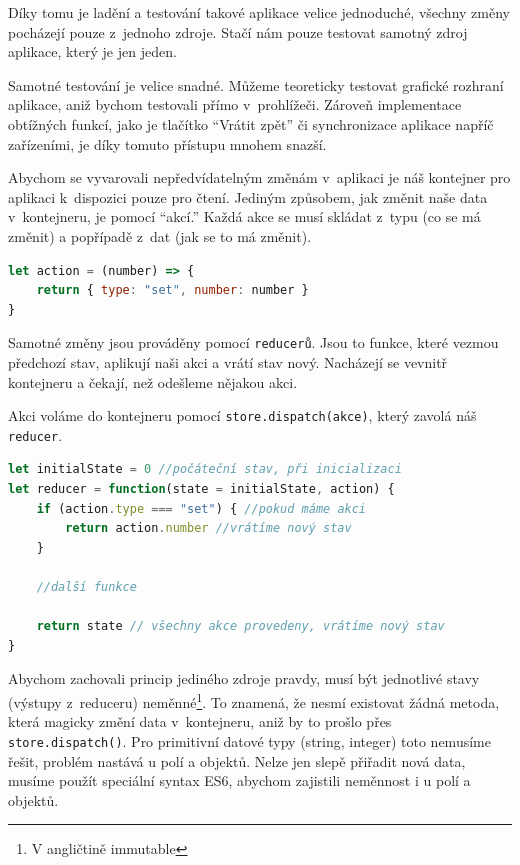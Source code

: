 \documentclass[a4paper,11pt,oneside]{article}
\begin{document}
Díky tomu je ladění a testování takové aplikace velice jednoduché, všechny změny pocházejí pouze z~jednoho zdroje. Stačí nám pouze testovat samotný zdroj aplikace, který je jen jeden. 

Samotné testování je velice snadné. Můžeme teoreticky testovat grafické rozhraní aplikace, aniž bychom testovali přímo v~prohlížeči. Zároveň implementace obtížných funkcí, jako je tlačítko \enquote{Vrátit zpět} či synchronizace aplikace napříč zařízeními, je díky tomuto přístupu mnohem snazší. 

Abychom se vyvarovali nepředvídatelným změnám v~aplikaci je náš kontejner pro aplikaci k~dispozici pouze pro čtení. Jediným způsobem, jak změnit naše data v~kontejneru, je pomocí \enquote{akcí.} Každá akce se musí skládat z~typu (co se má změnit) a popřípadě z~dat (jak se to má změnit). 

\begin{lstlisting}[language=javascript, caption={JavaScript}]
let action = (number) => {
	return { type: "set", number: number }
}
\end{lstlisting}

Samotné změny jsou prováděny pomocí \lstinline|reducerů|. Jsou to funkce, které vezmou předchozí stav, aplikují naši akci a vrátí stav nový. Nacházejí se vevnitř kontejneru a čekají, než odešleme nějakou akci.

Akci voláme do kontejneru pomocí \lstinline|store.dispatch(akce)|, který zavolá náš \lstinline|reducer|.

\begin{lstlisting}[language=javascript, caption={JavaScript}]
let initialState = 0 //počáteční stav, při inicializaci
let reducer = function(state = initialState, action) {
	if (action.type === "set") { //pokud máme akci 
		return action.number //vrátíme nový stav
	} 
	
	//další funkce
	
	return state // všechny akce provedeny, vrátíme nový stav
}
\end{lstlisting}

Abychom zachovali princip jediného zdroje pravdy, musí být jednotlivé stavy (výstupy z~reduceru) neměnné\footnote{V angličtině immutable}. To znamená, že nesmí existovat žádná metoda, která magicky změní data v~kontejneru, aniž by to prošlo přes \lstinline|store.dispatch()|. Pro primitivní datové typy (string, integer) toto nemusíme řešit, problém nastává u polí a objektů. Nelze jen slepě přiřadit nová data, musíme použít speciální syntax ES6, abychom zajistili neměnnost i u polí a objektů.
\end{document}

